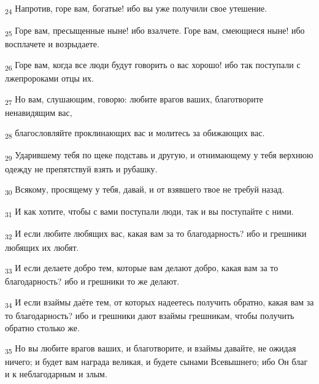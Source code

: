 \begin{tcolorbox}
\textsubscript{24} Напротив, горе вам, богатые! ибо вы уже получили свое утешение.
\end{tcolorbox}
\begin{tcolorbox}
\textsubscript{25} Горе вам, пресыщенные ныне! ибо взалчете. Горе вам, смеющиеся ныне! ибо восплачете и возрыдаете.
\end{tcolorbox}
\begin{tcolorbox}
\textsubscript{26} Горе вам, когда все люди будут говорить о вас хорошо! ибо так поступали с лжепророками отцы их.
\end{tcolorbox}
\begin{tcolorbox}
\textsubscript{27} Но вам, слушающим, говорю: любите врагов ваших, благотворите ненавидящим вас,
\end{tcolorbox}
\begin{tcolorbox}
\textsubscript{28} благословляйте проклинающих вас и молитесь за обижающих вас.
\end{tcolorbox}
\begin{tcolorbox}
\textsubscript{29} Ударившему тебя по щеке подставь и другую, и отнимающему у тебя верхнюю одежду не препятствуй взять и рубашку.
\end{tcolorbox}
\begin{tcolorbox}
\textsubscript{30} Всякому, просящему у тебя, давай, и от взявшего твое не требуй назад.
\end{tcolorbox}
\begin{tcolorbox}
\textsubscript{31} И как хотите, чтобы с вами поступали люди, так и вы поступайте с ними.
\end{tcolorbox}
\begin{tcolorbox}
\textsubscript{32} И если любите любящих вас, какая вам за то благодарность? ибо и грешники любящих их любят.
\end{tcolorbox}
\begin{tcolorbox}
\textsubscript{33} И если делаете добро тем, которые вам делают добро, какая вам за то благодарность? ибо и грешники то же делают.
\end{tcolorbox}
\begin{tcolorbox}
\textsubscript{34} И если взаймы даёте тем, от которых надеетесь получить обратно, какая вам за то благодарность? ибо и грешники дают взаймы грешникам, чтобы получить обратно столько же.
\end{tcolorbox}
\begin{tcolorbox}
\textsubscript{35} Но вы любите врагов ваших, и благотворите, и взаймы давайте, не ожидая ничего; и будет вам награда великая, и будете сынами Всевышнего; ибо Он благ и к неблагодарным и злым.
\end{tcolorbox}
